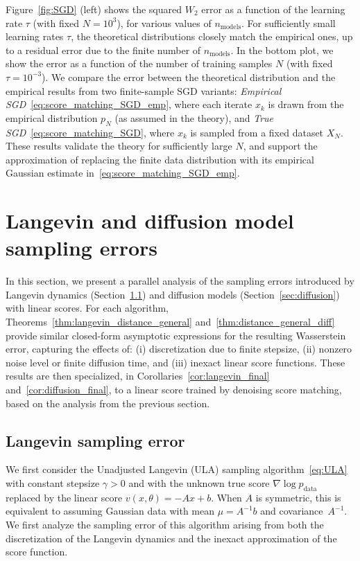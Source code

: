 \documentclass[11pt]{article}
\begin{document}
Figure~\ref{fig:SGD} (left) shows the squared \( W_2 \) error as a function of the learning rate \( \tau \) (with fixed \( N = 10^3 \)), for various values of \( n_{\text{models}} \). For sufficiently small learning rates $\tau$, the theoretical distributions closely match the empirical ones, up to a residual error due to the finite number of \( n_{\text{models}} \). In the bottom plot, we show the error as a function of the number of training samples \( N \) (with fixed \( \tau = 10^{-3} \)). We compare the error between the theoretical distribution and the empirical results from two finite-sample SGD variants: \emph{Empirical SGD}~\eqref{eq:score_matching_SGD_emp}, where each iterate \( x_k \) is drawn from the empirical distribution \( p_N \) (as assumed in the theory), and \emph{True SGD}~\eqref{eq:score_matching_SGD}, where \( x_k \) is sampled from a fixed dataset \( X_N \). These results validate the theory for sufficiently large \( N \), and support the approximation of replacing the finite data distribution with its empirical Gaussian estimate in~\eqref{eq:score_matching_SGD_emp}.


\section{Langevin and diffusion model sampling errors}

In this section, we present a parallel analysis of the sampling errors introduced by Langevin dynamics (Section~\ref{sec:langevin}) and diffusion models (Section~\ref{sec:diffusion}) with linear scores. For each algorithm, Theorems~\ref{thm:langevin_distance_general} and~\ref{thm:distance_general_diff} provide similar closed-form asymptotic expressions for the resulting Wasserstein error, capturing the effects of: (i) discretization due to finite stepsize, (ii) nonzero noise level or finite diffusion time, and (iii) inexact linear score functions. These results are then specialized, in Corollaries~\ref{cor:langevin_final} and~\ref{cor:diffusion_final}, to a linear score trained by denoising score matching, based on the analysis from the previous section.

\subsection{Langevin sampling error}
\label{sec:langevin}

We first consider the Unadjusted Langevin (ULA) sampling algorithm~\eqref{eq:ULA} with constant stepsize $\gamma >0$ and with the unknown true score $\nabla \log p_\mathrm{data}$ replaced by the linear score $v(x, \theta) = -A x + b$.
When $A$ is symmetric, this is equivalent to assuming Gaussian data with mean $\mu = A^{-1}b$ and covariance~$A^{-1}$. 
We first analyze the sampling error of this algorithm arising from both the discretization of the Langevin dynamics and the inexact approximation of the score function. 
\end{document}
